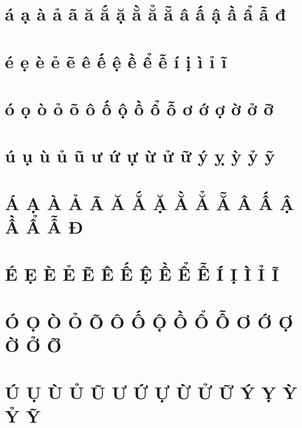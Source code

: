 \documentclass{article}
\begin{document}
\section{á ạ à ả ã ă ắ ặ ằ ẳ ẵ â ấ ậ ầ ẩ ẫ đ}
\section{é ẹ è ẻ ẽ ê ế ệ ề ể ễ í ị ì ỉ ĩ}
\section{ó ọ ò ỏ õ ô ố ộ ồ ổ ỗ ơ ớ ợ ờ ở ỡ}
\section{ú ụ ù ủ ũ ư ứ ự ừ ử ữ ý ỵ ỳ ỷ ỹ }
\section{Á Ạ À Ả Ã Ă Ắ Ặ Ằ Ẳ Ẵ Â Ấ Ậ Ầ Ẩ Ẫ Đ}
\section{É Ẹ È Ẻ Ẽ Ê Ế Ệ Ề Ể Ễ Í Ị Ì Ỉ Ĩ}
\section{Ó Ọ Ò Ỏ Õ Ô Ố Ộ Ồ Ổ Ỗ Ơ Ớ Ợ Ờ Ở Ỡ}
\section{Ú Ụ Ù Ủ Ũ Ư Ứ Ự Ừ Ử Ữ Ý Ỵ Ỳ Ỷ Ỹ }
\end{document}
